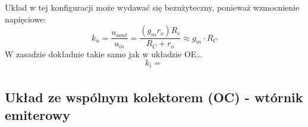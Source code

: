         Układ w tej konfiguracji może wydawać się bezużyteczny, ponieważ wzmocnienie napięciowe:
        \begin{equation}
            k_u = \frac{u_{oout}}{u_{in}} = \frac{(g_m r_o)R_c}{R_C+r_o} \approx g_m\cdot R_C
        \end{equation}
        W zasadzie dokładnie takie samo jak w układzie OE\dots
        \begin{equation}
            k_i = \frac{}{}
        \end{equation}

    \subsection{Układ ze wspólnym kolektorem (OC) - wtórnik emiterowy}
